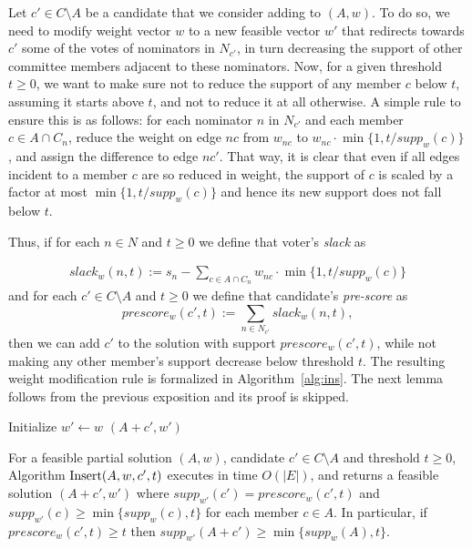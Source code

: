 Let $c'\in C\setminus A$ be a candidate that we consider adding to $(A,w)$. To do so, we need to modify weight vector $w$ to a new feasible vector $w'$ that redirects towards $c'$ some of the votes of nominators in $N_{c'}$, in turn decreasing the support of other committee members adjacent to these nominators. Now, for a given threshold $t\geq 0$, we want to make sure not to reduce the support of any member $c$ below $t$, assuming it starts above $t$, and not to reduce it at all otherwise. A simple rule to ensure this is as follows: for each nominator $n$ in $N_{c'}$ and each member $c\in A\cap C_n$, reduce the weight on edge $nc$ from $w_{nc}$ to $w_{nc}\cdot \min\{1, t/supp_w(c)\}$, and assign the difference to edge $nc'$. That way, it is clear that even if all edges incident to a member $c$ are so reduced in weight, the support of $c$ is scaled by a factor at most $\min\{1, t/supp_w(c)\}$ and hence its new support does not fall below $t$.

Thus, if for each $n\in N$ and $t\geq 0$ we define that voter's \emph{slack} as

\begin{align}
    slack_w(n,t):= s_n - \sum_{c\in A\cap C_n} w_{nc} \cdot\min \Big\{ 1, t/supp_w(c)\Big\} \label{eq:slack}
\end{align}
%
and for each $c'\in C\setminus A$ and $t\geq 0$ we define that candidate's \emph{pre-score} as
%
\begin{equation}\label{eq:prescore}
    prescore_w(c',t) := \sum_{n\in N_{c'}} slack_w(n,t),
\end{equation}
%
then we can add $c'$ to the solution with support $prescore_w(c',t)$, while not making any other member's support decrease below threshold $t$. The resulting weight modification rule is formalized in Algorithm~\ref{alg:ins}. The next lemma follows from the previous exposition and its proof is skipped.

\begin{algorithm}[htb]\label{alg:ins}
\SetAlgoLined
{}
Initialize $w'\leftarrow w$\;
\Return $(A+c',w')$\;
 \caption{$\ins(A,w,c',t)$}
\end{algorithm}

\begin{lemma}\label{lem:insert}
For a feasible partial solution $(A,w)$, candidate $c'\in C\setminus A$ and threshold $t\geq 0$, Algorithm $\ins(A,w,c',t)$ executes in time $O(|E|)$, and returns a feasible solution $(A+c',w')$ where $supp_{w'}(c')=prescore_w(c',t)$ and $supp_{w'}(c)\geq \min\{supp_w(c),t\}$ for each member $c\in A$. 
In particular, if $prescore_w(c',t)\geq t$ then $supp_{w'}(A+c')\geq \min\{supp_w(A),t\}$.
\end{lemma}

